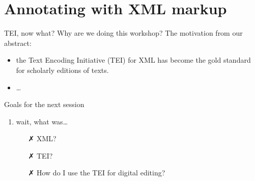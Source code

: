 

\section{Annotating with XML markup}

\begin{frame}{TEI, now what?}
    Why are we doing this workshop? The motivation from our abstract:
    \begin{itemize}
        \item \punkti the Text Encoding Initiative (TEI) for XML has become the gold standard for scholarly editions of texts.
        \item \dots
    \end{itemize}
    
    \begin{block}{Goals for the next session}
    \begin{enumerate}
        \item wait, what was\dots
        \begin{itemize}
            \item[\textcolor{alert}{\faClose}] XML?
            \item[\textcolor{alert}{\faClose}] TEI?
            \item[\textcolor{alert}{\faClose}] How do I use the TEI for digital editing?
        \end{itemize}
    \end{enumerate}

    \end{block}
\end{frame}

